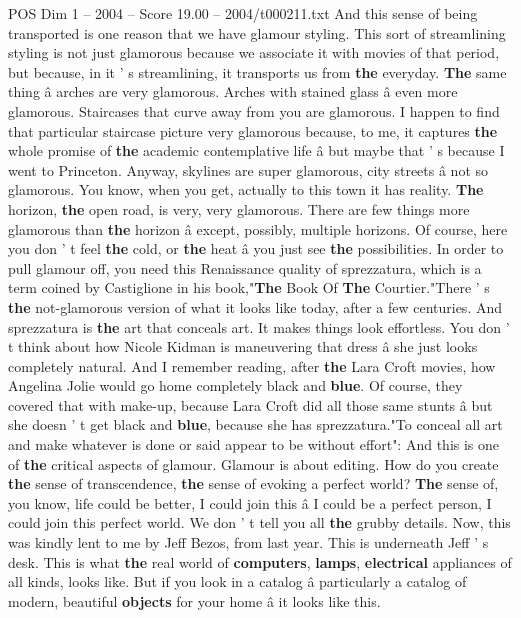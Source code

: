 \begin{textsample}{POS Dim 1 – 2004 – Score 19.00 – 2004/t000211.txt}
And this sense of being transported is one reason that we have glamour styling.
This sort of streamlining styling is not just glamorous because we associate it with movies of that period, but because, in it ' s streamlining, it transports us from \textbf{the} everyday. \textbf{The} same thing â arches are very glamorous.
Arches with stained glass â even more glamorous.
Staircases that curve away from you are glamorous.
I happen to find that particular staircase picture very glamorous because, to me, it captures \textbf{the} whole promise of \textbf{the} academic contemplative life â but maybe that ' s because I went to Princeton.
Anyway, skylines are super glamorous, city streets â not so glamorous.
You know, when you get, actually to this town it has reality. \textbf{The} horizon, \textbf{the} open road, is very, very glamorous.
There are few things more glamorous than \textbf{the} horizon â except, possibly, multiple horizons.
Of course, here you don ' t feel \textbf{the} cold, or \textbf{the} heat â you just see \textbf{the} possibilities.
In order to pull glamour off, you need this Renaissance quality of sprezzatura, which is a term coined by Castiglione in his book,"\textbf{The} Book Of \textbf{The} Courtier."There ' s \textbf{the} not-glamorous version of what it looks like today, after a few centuries.
And sprezzatura is \textbf{the} art that conceals art.
It makes things look effortless.
You don ' t think about how Nicole Kidman is maneuvering that dress â she just looks completely natural.
And I remember reading, after \textbf{the} Lara Croft movies, how Angelina Jolie would go home completely black and \textbf{blue}.
Of course, they covered that with make-up, because Lara Croft did all those same stunts â but she doesn ' t get black and \textbf{blue}, because she has sprezzatura."To conceal all art and make whatever is done or said appear to be without effort": And this is one of \textbf{the} critical aspects of glamour.
Glamour is about editing.
How do you create \textbf{the} sense of transcendence, \textbf{the} sense of evoking a perfect world? \textbf{The} sense of, you know, life could be better, I could join this â I could be a perfect person, I could join this perfect world.
We don ' t tell you all \textbf{the} grubby details.
Now, this was kindly lent to me by Jeff Bezos, from last year.
This is underneath Jeff ' s desk.
This is what \textbf{the} real world of \textbf{computers}, \textbf{lamps}, \textbf{electrical} appliances of all kinds, looks like.
But if you look in a catalog â particularly a catalog of modern, beautiful \textbf{objects} for your home â it looks like this.

\end{textsample}
